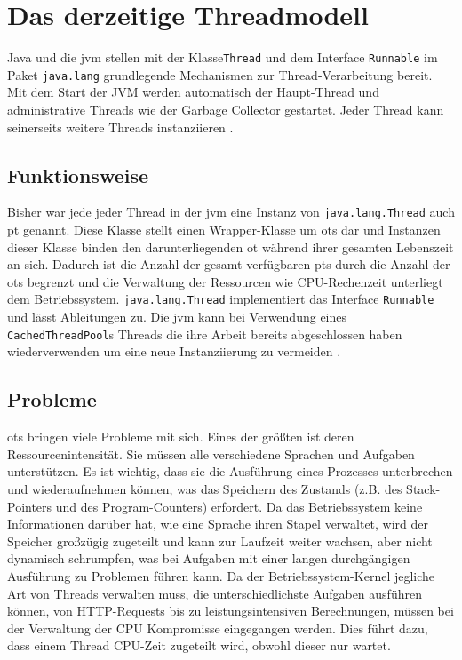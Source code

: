 \chapter{Das derzeitige Threadmodell}
\label{cha:DasDerzeitigeThreadmodell}                   %
    Java und die \gls{jvm} stellen mit der Klasse\texttt{Thread} und dem Interface \texttt{Runnable} im Paket \texttt{java.lang} grundlegende Mechanismen zur Thread-Verarbeitung bereit.
    Mit dem Start der JVM werden automatisch der Haupt-Thread und administrative Threads wie der Garbage Collector gestartet. Jeder Thread kann seinerseits weitere Threads instanziieren \cite{GrundKursBS}.
    
\section{Funktionsweise}                                         
\label{sec:Funktionsweise}

    Bisher war jede jeder Thread in der \gls{jvm} eine Instanz von \texttt{java.lang.Thread} auch \gls{pt} genannt. Diese Klasse stellt einen Wrapper-Klasse um \Glspl{ot} dar und Instanzen dieser Klasse
    binden den darunterliegenden \gls{ot}  während ihrer gesamten Lebenszeit an sich. Dadurch ist die Anzahl der gesamt verfügbaren \Glspl{pt} durch die Anzahl der \Glspl{ot} begrenzt und die Verwaltung
    der Ressourcen wie CPU-Rechenzeit unterliegt dem Betriebssystem. \cite{JEP425}
    \texttt{java.lang.Thread} implementiert das Interface \texttt{Runnable} und lässt Ableitungen zu. Die \gls{jvm} kann bei Verwendung eines \texttt{CachedThreadPool}s Threads die ihre Arbeit bereits 
    abgeschlossen haben wiederverwenden um eine neue Instanziierung zu vermeiden \cite{Executors}.

    
\section{Probleme}                                         
\label{sec:Probleme}

    \Glspl{ot} bringen viele Probleme mit sich. Eines der größten ist deren Ressourcenintensität.
    Sie müssen alle verschiedene Sprachen und Aufgaben unterstützen. Es ist wichtig, dass sie die Ausführung eines Prozesses unterbrechen und
    wiederaufnehmen können, 
    was das Speichern des Zustands (z.B. des Stack-Pointers und des Program-Counters) erfordert. Da das Betriebssystem keine Informationen darüber hat, wie
    eine Sprache ihren Stapel verwaltet, wird der Speicher großzügig zugeteilt und kann zur Laufzeit weiter wachsen, aber nicht dynamisch schrumpfen,
    was bei Aufgaben mit einer langen durchgängigen Ausführung zu Problemen führen kann. Da der Betriebssystem-Kernel jegliche Art von Threads verwalten muss,
    die unterschiedlichste Aufgaben ausführen können, von HTTP-Requests bis zu leistungsintensiven Berechnungen, müssen bei der
    Verwaltung der CPU Kompromisse eingegangen werden. Dies führt dazu, dass einem Thread CPU-Zeit zugeteilt wird, obwohl dieser nur wartet. \cite{ProjectLoom}
    

